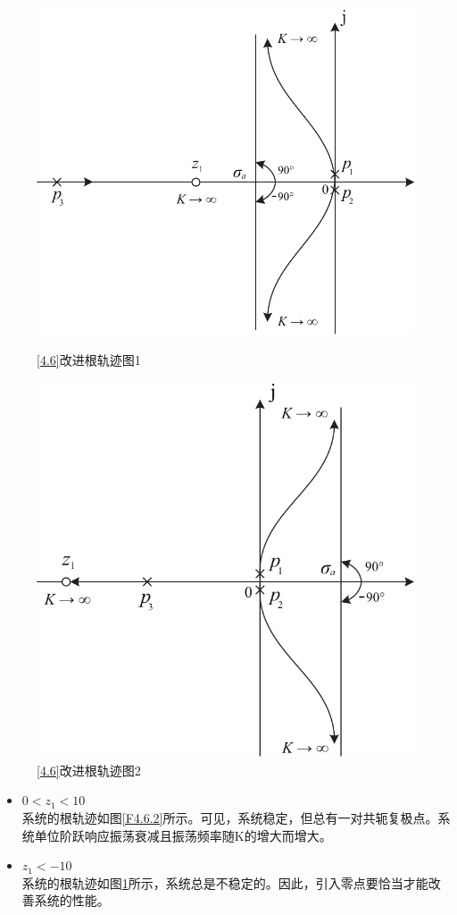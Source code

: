 \begin{figure}[!htb]
\begin{minipage}{0.5\linewidth}

		\centering
		\includegraphics[width=0.98\linewidth]{pic/4.6.2.pdf}
		\caption{\ref{4.6}改进根轨迹图1}
		\label{F4.6.2}
\end{minipage}
\begin{minipage}{0.5\linewidth}
		\centering
		\includegraphics[width=0.85\linewidth]{pic/4.6.3.pdf}
		\caption{\ref{4.6}改进根轨迹图2}
		\label{F4.6.3}
\end{minipage}
\end{figure}
\begin{itemize}
	\item $ 0 < z_1 < 10$\\
	系统的根轨迹如图\ref{F4.6.2}所示。可见，系统稳定，但总有一对共轭复极点。系统单位阶跃响应振荡衰减且振荡频率随K的增大而增大。
	
	\item $z_1 < -10$\\
	系统的根轨迹如图\ref{F4.6.3}所示，系统总是不稳定的。因此，引入零点要恰当才能改善系统的性能。
\end{itemize}

